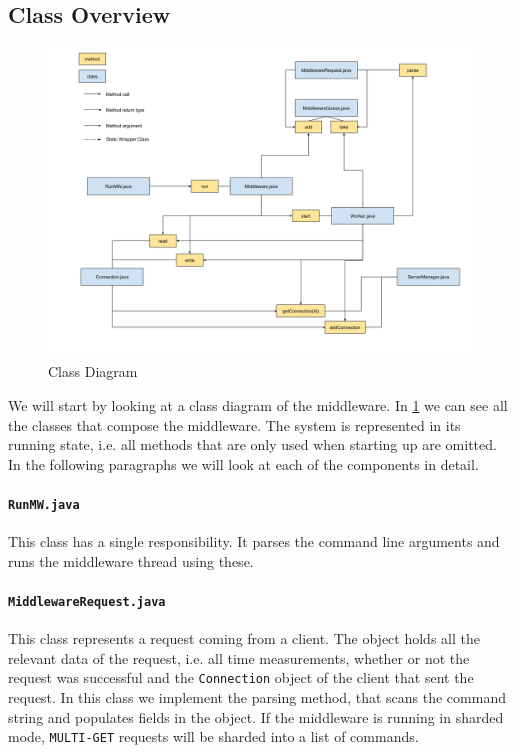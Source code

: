 \documentclass[11pt,a4paper]{article}
\begin{document}
\subsection{Class Overview}
%
\begin{figure}[H]
    \includegraphics[width=\linewidth]{../illustrations/class_diagram.png}
    \caption{Class Diagram}
    \label{fig:class_diagram}
\end{figure}
%
We will start by looking at a class diagram of the middleware.
%
In \ref{fig:class_diagram} we can see all the classes that compose the middleware.
%
The system is represented in its running state, i.e. all methods that are only used when starting up are omitted.
%
In the following paragraphs we will look at each of the components in detail.
%
\paragraph{\texttt{RunMW.java}}
%
This class has a single responsibility. It parses the command line arguments and runs the middleware thread using these.
%
\paragraph{\texttt{MiddlewareRequest.java}}
%
This class represents a request coming from a client.
%
The object holds all the relevant data of the request, i.e. all time measurements, whether or not the request was successful and the \texttt{Connection} object of the client that sent the request.
%
In this class we implement the parsing method, that scans the command string and populates fields in the object.
%
If the middleware is running in sharded mode, \texttt{MULTI-GET} requests will be sharded into a list of commands.
%
\end{document}
